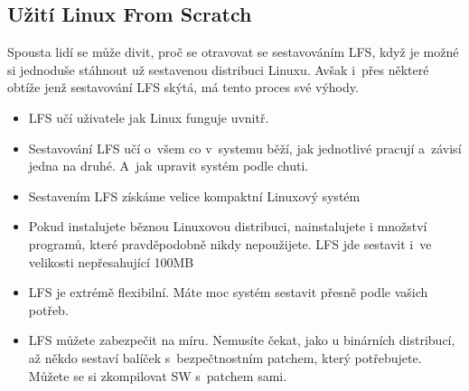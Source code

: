 \documentclass[a4paper,12pt]{article}
\begin{document}
\subsection{Užití Linux From Scratch}
Spousta lidí se může divit, proč se otravovat se sestavováním LFS, když je možné si jednoduše stáhnout už sestavenou distribuci Linuxu. Avšak i~přes některé obtíže jenž sestavování LFS skýtá, má tento proces své výhody.~\cite{LFS}
\begin{itemize}
 \item LFS učí uživatele jak Linux funguje uvnitř.
 \item Sestavování LFS učí o~všem co v~systemu běží, jak jednotlivé pracují a~závisí jedna na druhé. A~jak upravit systém podle chuti.
 \item Sestavením LFS získáme velice kompaktní Linuxový systém
 \item Pokud instalujete běznou Linuxovou distribuci, nainstalujete i množství programů, které pravděpodobně nikdy nepoužijete. LFS jde sestavit i~ve velikosti nepřesahující 100MB
\item LFS je extrémě flexibilní. Máte moc systém sestavit přesně podle vašich potřeb.
\item LFS můžete zabezpečit na míru. Nemusíte čekat, jako u binárních distribucí, až někdo sestaví balíček s~bezpečtnostním patchem, který potřebujete. Můžete se si zkompilovat SW s~patchem sami.
\end{itemize}
\end{document}
